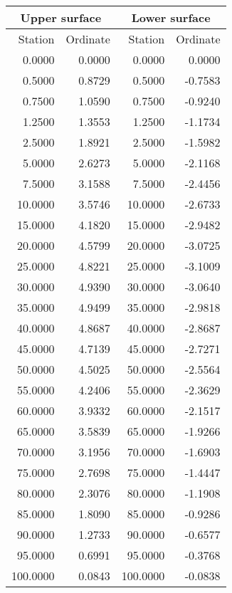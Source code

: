 \documentclass[11pt]{book}
\begin{document}
 \vspace{8mm}
 \begin{tabular}{|r|r|r|r|} \hline 
 \multicolumn{2}{|c|}{Upper surface} & \multicolumn{2}{|c|}{Lower surface} \\
 \hline
 Station & Ordinate & Station & Ordinate \\
 \hline
0.0000 & 0.0000 & 0.0000 & 0.0000 \\
0.5000 & 0.8729 & 0.5000 & -0.7583 \\
0.7500 & 1.0590 & 0.7500 & -0.9240 \\
1.2500 & 1.3553 & 1.2500 & -1.1734 \\
2.5000 & 1.8921 & 2.5000 & -1.5982 \\
5.0000 & 2.6273 & 5.0000 & -2.1168 \\
7.5000 & 3.1588 & 7.5000 & -2.4456 \\
10.0000 & 3.5746 & 10.0000 & -2.6733 \\
15.0000 & 4.1820 & 15.0000 & -2.9482 \\
20.0000 & 4.5799 & 20.0000 & -3.0725 \\
25.0000 & 4.8221 & 25.0000 & -3.1009 \\
30.0000 & 4.9390 & 30.0000 & -3.0640 \\
35.0000 & 4.9499 & 35.0000 & -2.9818 \\
40.0000 & 4.8687 & 40.0000 & -2.8687 \\
45.0000 & 4.7139 & 45.0000 & -2.7271 \\
50.0000 & 4.5025 & 50.0000 & -2.5564 \\
55.0000 & 4.2406 & 55.0000 & -2.3629 \\
60.0000 & 3.9332 & 60.0000 & -2.1517 \\
65.0000 & 3.5839 & 65.0000 & -1.9266 \\
70.0000 & 3.1956 & 70.0000 & -1.6903 \\
75.0000 & 2.7698 & 75.0000 & -1.4447 \\
80.0000 & 2.3076 & 80.0000 & -1.1908 \\
85.0000 & 1.8090 & 85.0000 & -0.9286 \\
90.0000 & 1.2733 & 90.0000 & -0.6577 \\
95.0000 & 0.6991 & 95.0000 & -0.3768 \\
100.0000 & 0.0843 & 100.0000 & -0.0838 \\
 \hline 
 \end{tabular}
 \hspace{4mm}
\end{document}
